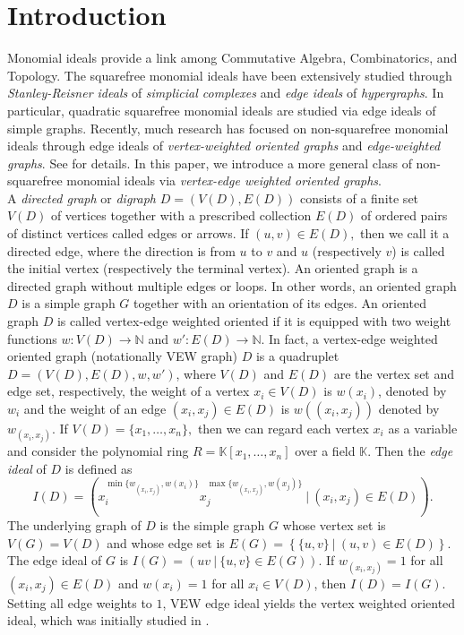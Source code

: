 \documentclass[11pt,reqno]{amsart}
\theoremstyle{definition}
\begin{document}
\section{Introduction}
Monomial ideals provide a link among Commutative Algebra, Combinatorics, and Topology. The squarefree monomial ideals have been extensively studied through {\em Stanley-Reisner ideals} of {\em simplicial complexes} and {\em edge ideals} of {\em hypergraphs}. In particular, quadratic squarefree monomial ideals are studied via edge ideals of simple graphs. Recently, much research has focused on non-squarefree monomial ideals through edge ideals of {\em vertex-weighted oriented graphs} and {\em edge-weighted graphs}. See \cite{kanoy1, kblo22, cs13,cpr22, fsty21, gmsv18,  kumar1, kumar2, kumar3, mandal1, mandal2, mandal3, mandal4,pitones, zhu}
 for details. In this paper, we introduce a more general class of non-squarefree monomial ideals via {\em vertex-edge weighted oriented graphs}.
\vspace{0.2cm}\\
A \textit{directed graph} or\textit{ digraph} $D=(V(D),E(D))$ consists of a finite set $V(D)$ of vertices together with a prescribed collection $E(D)$ of ordered pairs of distinct vertices called edges or arrows. If $ (u,v) \in E(D),$ then we call it a directed edge, where the direction is from $ u $ to $ v $ and $ u $ (respectively $ v $) is called the initial vertex (respectively the terminal vertex). An oriented graph is a directed graph without multiple edges or loops. In other words, an oriented graph $D$ is a simple graph $G$ together with an orientation of its edges. 
An oriented graph $D$ is called vertex-edge weighted oriented if it is equipped with two weight functions $w:V(D)\longrightarrow \mathbb N$ and $w':E(D) \longrightarrow \mathbb N $. In fact, a vertex-edge weighted oriented graph (notationally VEW graph) $D$ is a quadruplet $D=(V(D), E(D), w,w')$, where  $V(D)$ and  $E(D)$ are the vertex set and edge set,  respectively, the weight of a vertex $x_i\in V(D)$ is $w(x_i)$, denoted by $w_i$ and the weight of an edge $(x_i,x_j) \in E(D)$ is $w((x_i,x_j))$ denoted by $w_{(x_i,x_j)}$. If $V(D)=\{x_1,\ldots ,x_n\},$ then we can regard each vertex $x_i$ as a variable and consider the polynomial ring $R=\mathbb{K}[x_1,\ldots ,x_n]$ over a field $\mathbb{K}$. 
 Then the {\em edge ideal } of $D$  is defined  as
$$I(D)  =  (x_i^{\min\{w_{(x_i,x_j)},w(x_i)\}} x_j^{\max\{w_{(x_i,x_j)},w(x_j)\}}~|~(x_i,x_j) \in E(D) ).$$ The underlying graph of $ D $ is the simple graph $ G $ whose
vertex set is $V(G) = V(D) $ and whose edge set is $E(G)= \left\{
\{u,v\}~|~(u, v) \in E(D)  \right\}.$  The edge ideal of $ G $ is 
$I(G) = ( uv ~|~  \{u, v\} \in E(G) ).$
If $w_{(x_i,x_j)} = 1 $ for all $(x_i, x_j) \in E(D)  $ and $w(x_i)=1$ for all $x_i \in V(D)$, then $I(D) = I(G)$.    
 Setting all edge weights to $1$, VEW edge ideal yields the vertex weighted oriented ideal, which was initially studied in \cite{pitones}.
\end{document}
